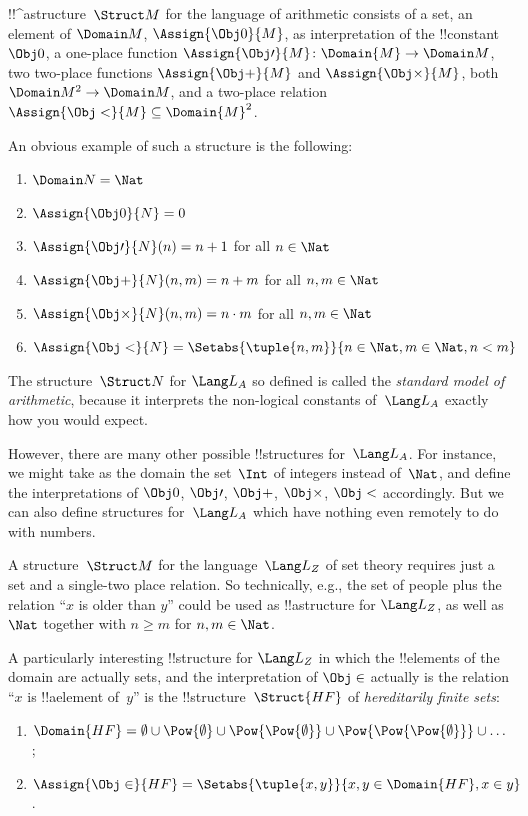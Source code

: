 \begin{ex}
!!^a{structure}~$\Struct M$ for the language of arithmetic consists of a
  set, an element of $\Domain M$, $\Assign{\Obj 0}{M}$, as
  interpretation of the !!{constant}~$\Obj 0$, a one-place function
  $\Assign{\Obj \prime}{M} \colon \Domain{M} \to \Domain M$, two
  two-place functions $\Assign{\Obj +}{M}$ and $\Assign{\Obj
    \times}{M}$, both $\Domain M^2 \to \Domain M$, and a two-place
  relation $\Assign{\Obj <}{M} \subseteq \Domain{M}^2$.

An obvious example of such a structure is the following:
\begin{enumerate}
\item $\Domain N = \Nat$
\item $\Assign{\Obj 0}{N} = 0$
\item $\Assign{\Obj \prime}{N}(n) = n + 1$ for all $n \in \Nat$
\item $\Assign{\Obj +}{N}(n, m) = n + m$ for all $n, m \in \Nat$
\item $\Assign{\Obj \times}{N}(n, m) = n\cdot m$ for all $n, m \in \Nat$
\item $\Assign{\Obj <}{N} = \Setabs{\tuple{n, m}}{n \in \Nat, m \in
  \Nat, n < m}$
\end{enumerate}
The structure~$\Struct N$ for $\Lang L_A$ so defined is called the
\emph{standard model of arithmetic}, because it interprets the
non-logical constants of~$\Lang L_A$ exactly how you would expect.

However, there are many other possible !!{structure}s for~$\Lang
L_A$. For instance, we might take as the domain the set~$\Int$ of
integers instead of~$\Nat$, and define the interpretations of $\Obj
0$, $\Obj \prime$, $\Obj +$, $\Obj \times$, $\Obj <$ accordingly.  But
we can also define structures for~$\Lang L_A$ which have nothing even
remotely to do with numbers.
\end{ex}

\begin{ex}
A structure~$\Struct M$ for the language~$\Lang L_Z$ of set theory requires
just a set and a single-two place relation. So technically, e.g., the
set of people plus the relation ``$x$ is older than $y$'' could be
used as !!a{structure} for $\Lang L_Z$, as well as $\Nat$ together
with $n \ge m$ for $n, m \in \Nat$.

A particularly interesting !!{structure} for $\Lang L_Z$ in which the
!!{element}s of the domain are actually sets, and the interpretation
of $\Obj \in$ actually is the relation ``$x$ is !!a{element} of~$y$''
is the !!{structure}~$\Struct{{HF}}$ of \emph{hereditarily finite sets}:
\begin{enumerate}
\item $\Domain{{{HF}}} = \emptyset \cup \Pow{\emptyset} \cup
  \Pow{\Pow{\emptyset}} \cup \Pow{\Pow{\Pow{\emptyset}}} \cup \dots$;
\item $\Assign{\Obj \in}{{{HF}}} = \Setabs{\tuple{x, y}}{x, y \in
  \Domain{{{HF}}}, x \in y}$.
\end{enumerate}
\end{ex}

